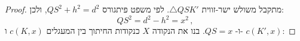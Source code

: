 \begin{proof}
%

מתקבל משולש ישר-זווית
$\triangle QSK'$.
לפי משפט פיתגורס
$QS^2 + h^2 = d^2$,
ולכן:
\[
QS^2 = d^2 - h^2 = x^2\,,
\]
ו-%
$QS = x$.
בנו את הנקודה
$X$
כנקודות החיתוך בין המעגלים
$c(K,x)$
ו-%
$c(K',x)$:


\end{proof}
